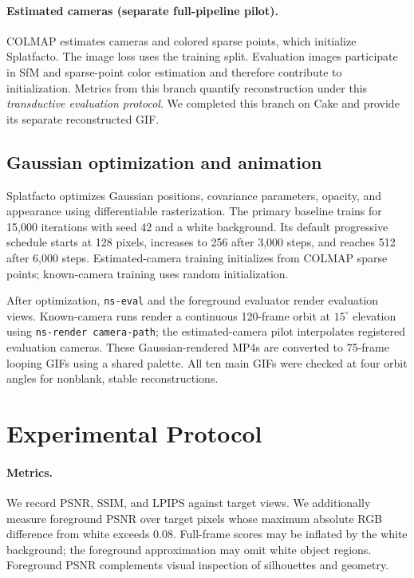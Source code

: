 \documentclass{article}
\begin{document}
\paragraph{Estimated cameras (separate full-pipeline pilot).}
COLMAP estimates cameras and colored sparse points, which initialize Splatfacto. The image loss uses the training split. Evaluation images participate in SfM and sparse-point color estimation and therefore contribute to initialization. Metrics from this branch quantify reconstruction under this \emph{transductive evaluation protocol}. We completed this branch on Cake and provide its separate reconstructed GIF.

\subsection{Gaussian optimization and animation}
Splatfacto optimizes Gaussian positions, covariance parameters, opacity, and appearance using differentiable rasterization. The primary baseline trains for 15,000 iterations with seed 42 and a white background. Its default progressive schedule starts at 128 pixels, increases to 256 after 3,000 steps, and reaches 512 after 6,000 steps. Estimated-camera training initializes from COLMAP sparse points; known-camera training uses random initialization.

After optimization, \texttt{ns-eval} and the foreground evaluator render evaluation views. Known-camera runs render a continuous 120-frame orbit at $15^\circ$ elevation using \texttt{ns-render camera-path}; the estimated-camera pilot interpolates registered evaluation cameras. These Gaussian-rendered MP4s are converted to 75-frame looping GIFs using a shared palette. All ten main GIFs were checked at four orbit angles for nonblank, stable reconstructions.

\section{Experimental Protocol}
\paragraph{Metrics.}
We record PSNR, SSIM, and LPIPS against target views. We additionally measure foreground PSNR over target pixels whose maximum absolute RGB difference from white exceeds 0.08. Full-frame scores may be inflated by the white background; the foreground approximation may omit white object regions. Foreground PSNR complements visual inspection of silhouettes and geometry.
\end{document}
